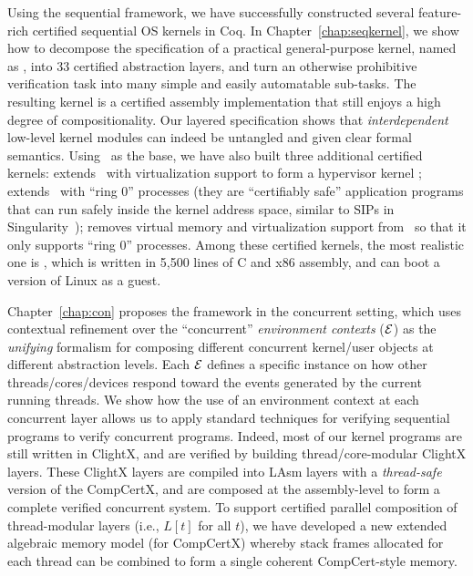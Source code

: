 
Using the sequential \CTOS{} framework, we have successfully
  constructed several feature-rich certified sequential OS kernels in Coq.
In   Chapter~\ref{chap:seqkernel},
we show how to decompose the specification of 
a practical general-purpose kernel,
named as \textbf{\mCTOS{}},
into 33 certified abstraction layers, and turn an otherwise 
  prohibitive verification task into many simple and easily automatable 
  sub-tasks.  The resulting kernel is a certified assembly implementation 
  that still enjoys a high degree of compositionality.
  Our layered specification shows that
  {\em interdependent} low-level kernel modules can indeed be
  untangled and given clear formal semantics.
 Using \mCTOS\ as the base, we have also built three additional
  certified kernels: {\bf{}\mCTOShyper} extends \mCTOS\ with virtualization
  support to form a hypervisor kernel ;
  {\bf{}\mCTOSringz} extends \mCTOShyper\ with ``ring 0'' processes
  (they are ``certifiably safe'' application programs that can run safely 
  inside the kernel address space, similar to SIPs in 
  Singularity~\cite{hunt07}); {\bf{}\mCTOSembed} removes virtual memory
  and virtualization support from \mCTOSringz\ so that it only supports 
  ``ring 0'' processes.
  Among these certified kernels,
  the most realistic one is \mCTOShyper{},
  which is written in 5,500 lines of C and x86
assembly, and can boot a version of Linux as a guest.   
  
 Chapter~\ref{chap:con} proposes 
the \CTOS{} framework in the concurrent setting,
 which uses
  contextual refinement over the ``concurrent'' {\em environment contexts}
  ($\mathcal{E}$) as the {\em unifying} formalism for composing 
  different concurrent kernel/user objects at different
  abstraction levels.  Each $\mathcal{E}$ defines a specific instance on how
  other threads/cores/devices respond toward the events generated by
  the current running threads.  
We show how the use of an environment context at each
  concurrent layer allows us to apply standard techniques for
  verifying sequential programs to verify concurrent programs.
   Indeed, most of our kernel programs are still written 
   in ClightX, and are verified by building
   thread/core-modular ClightX layers.
 These ClightX layers are compiled
 into LAsm layers
   with a {\em thread-safe} version of the CompCertX,
   and are composed at the assembly-level to form
   a complete verified concurrent system.
 To support certified parallel composition of
  thread-modular layers (i.e., $L[t]$ for all $t$), we have developed
  a new extended algebraic memory model (for CompCertX) whereby stack
  frames allocated for each thread can be combined to form a single
  coherent CompCert-style memory.

